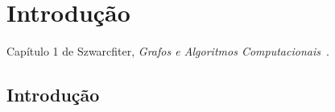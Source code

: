 \chapter{Introdução}


\setcounter{page}{1}    %


Capítulo 1 de Szwarcfiter, \textit{Grafos e Algoritmos Computacionais}~\cite{Szwarcfiter1986grafos}.

\section{Introdução}

\begin{easylist}

\end{easylist}
